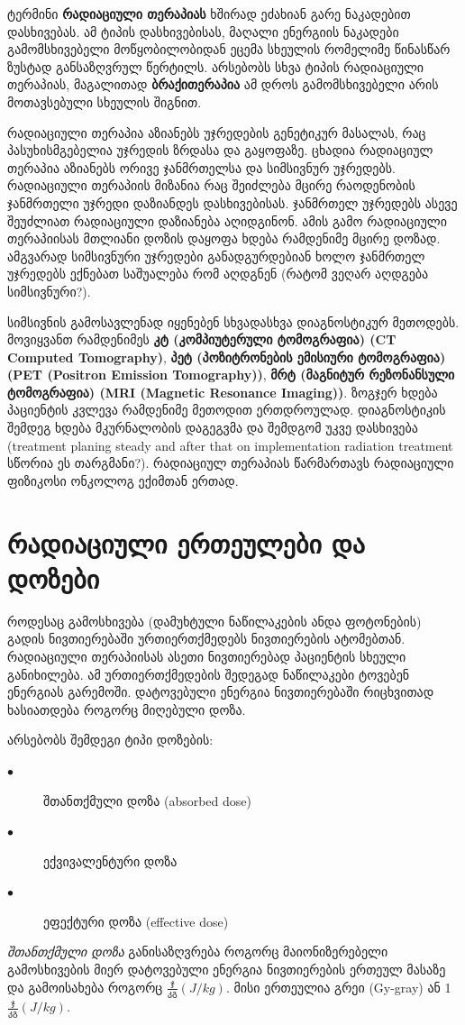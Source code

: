 \documentclass[12pt,a4paper,]{report}
\begin{document}
ტერმინი \textbf{რადიაციული თერაპიას} ხშირად ეძახიან  გარე ნაკადებით დასხივებას. ამ ტიპის დასხივებისას, მაღალი ენერგიის ნაკადები გამომსხივებელი მოწყობილობიდან ეცემა სხეულის რომელიმე წინასწარ ზუსტად განსაზღვრულ წერტილს. არსებობს სხვა ტიპის რადიაციული თერაპიას, მაგალითად \textbf{ბრაქითერაპია}\cite{brachytherapy} ამ დროს გამომსხივებელი არის მოთავსებული სხეულის შიგნით. 

რადიაციული თერაპია აზიანებს უჯრედების გენეტიკურ მასალას, რაც პასუხისმგებელია უჯრედის ზრდასა და გაყოფაზე. ცხადია რადიაციულ თერაპია აზიანებს ორივე ჯანმრთელსა და სიმსივნურ უჯრედებს. რადიაციული თერაპიის მიზანია რაც შეიძლება მცირე რაოდენობის ჯანმრთელი უჯრედი დაზიანდეს დასხივებისას. ჯანმრთელ უჯრედებს ასევე შეუძლიათ რადიაციული დაზიანება აღიდგინონ. ამის გამო რადიაციული თერაპიისას მთლიანი დოზის დაყოფა ხდება რამდენიმე მცირე დოზად. ამგვარად სიმსივნური უჯრედები განადგურდებიან ხოლო ჯანმრთელ უჯრედებს ექნებათ საშუალება რომ აღდგნენ (რატომ ვეღარ აღდგება სიმსივნური?). 

სიმსივნის გამოსავლენად იყენებენ სხვადასხვა დიაგნოსტიკურ მეთოდებს. მოვიყვანთ რამდენიმეს \textbf{კტ (კომპიუტერული ტომოგრაფია) (CT Computed Tomography)}, \textbf{პეტ (პოზიტრონების ემისიური ტომოგრაფია) (PET (Positron Emission Tomography))}, \textbf{მრტ (მაგნიტურ რეზონანსული ტომოგრაფია) (MRI (Magnetic Resonance Imaging))}. ზოგჯერ ხდება პაციენტის კვლევა რამდენიმე მეთოდით ერთდროულად. დიაგნოსტიკის შემდეგ ხდება მკურნალობის დაგეგვმა და შემდგომ უკვე დასხივება (treatment planing steady and after that on implementation radiation treatment სწორია ეს თარგმანი?). რადიაციულ თერაპიას წარმართავს რადიაციული ფიზიკოსი ონკოლოგ ექიმთან ერთად. 

\chapter{რადიაციული ერთეულები და დოზები}
როდესაც გამოსხივება (დამუხტული ნაწილაკების ანდა ფოტონების) გადის ნივთიერებაში ურთიერთქმედებს ნივთიერების ატომებთან. რადიაციული თერაპიისას ასეთი ნივთიერებად პაციენტის სხეული განიხილება. ამ ურთიერთქმედების შედეგად ნაწილაკები ტოვებენ ენერგიას გარემოში. დატოვებული ენერგია ნივთიერებაში რიცხვითად ხასიათდება როგორც მიღებული დოზა. 

არსებობს შემდეგი ტიპი დოზების:
	\begin{description}
      \item[$\bullet$] შთანთქმული დოზა  (absorbed dose)
      \item[$\bullet$] ექვივალენტური დოზა
      \item[$\bullet$] ეფექტური დოზა (effective dose)
    \end{description}
\textit{შთანთქმული დოზა} განისაზღვრება როგორც მაიონიზერებელი გამოსხივების მიერ დატოვებული ენერგია ნივთიერების ერთეულ მასაზე და გამოისახება როგორც $\frac{\text{ჯ}}{\text{კგ}} (J/kg)$. მისი ერთეულია გრეი (Gy-gray) ან 1$\frac{\text{ჯ}}{\text{კგ}} (J/kg)$.
\end{document}
